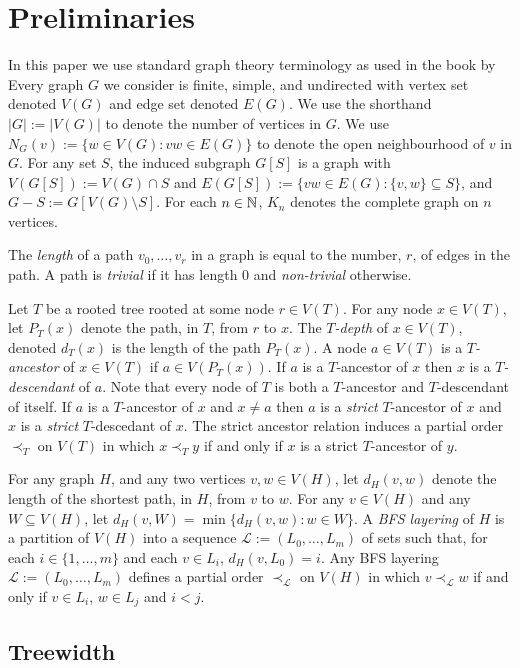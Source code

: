 \documentclass[kpfonts]{patmorin}
\theoremstyle{named}
\begin{document}
\section{Preliminaries}

In this paper we use standard graph theory terminology as used in the book by \citet{diestel:graph}
Every graph $G$ we consider is finite, simple, and undirected with vertex set denoted $V(G)$ and edge set denoted $E(G)$.  We use the shorthand $|G|:=|V(G)|$ to denote the number of vertices in $G$.  We use $N_G(v):=\{w\in V(G): vw\in E(G)\}$ to denote the open neighbourhood of $v$ in $G$.  For any set $S$, the induced subgraph  $G[S]$ is a graph with $V(G[S]):=V(G)\cap S$ and $E(G[S]):=\{vw\in E(G): \{v,w\}\subseteq S\}$, and $G-S:=G[V(G)\setminus S]$. For each $n\in\mathbb{N}$, $K_n$ denotes the complete graph on $n$ vertices.

The \emph{length} of a path $v_0,\ldots,v_r$ in a graph is equal to the number, $r$, of edges in the path. A path is \emph{trivial} if it has length 0 and \emph{non-trivial} otherwise.

Let $T$ be a rooted tree rooted at some node $r\in V(T)$.  For any node $x\in V(T)$, let $P_T(x)$ denote the path, in $T$, from $r$ to $x$.  The \emph{$T$-depth} of $x\in V(T)$, denoted $d_T(x)$ is the length of the path $P_T(x)$.  A node $a\in V(T)$ is a \emph{$T$-ancestor} of $x\in V(T)$ if $a\in V(P_T(x))$. If $a$ is a $T$-ancestor of $x$ then $x$ is a \emph{$T$-descendant} of $a$.  Note that every node of $T$ is both a $T$-ancestor and $T$-descendant of itself.  If $a$ is a $T$-ancestor of $x$ and $x\neq a$ then $a$ is a \emph{strict} $T$-ancestor of $x$ and $x$ is a \emph{strict} $T$-descedant of $x$.  The strict ancestor relation induces a partial order $\prec_T$ on $V(T)$ in which $x\prec_T y$ if and only if $x$ is a strict $T$-ancestor of $y$.

For any graph $H$, and any two vertices $v,w\in V(H)$, let $d_H(v,w)$ denote the length of the shortest path, in $H$, from $v$ to $w$. For any $v\in V(H)$ and any $W\subseteq V(H)$, let $d_H(v,W)=\min\{d_H(v,w):w\in W\}$. A \emph{BFS layering} of $H$ is a partition of $V(H)$ into a sequence $\mathcal{L}:=(L_0,\ldots,L_m)$ of sets such that, for each $i\in\{1,\ldots,m\}$ and each $v\in L_i$, $d_H(v,L_0)=i$.  Any BFS layering $\mathcal{L}:=(L_0,\ldots,L_m)$ defines a partial order $\prec_{\mathcal{L}}$ on $V(H)$ in which $v\prec_{\mathcal{L}} w$ if and only if $v\in L_i$, $w\in L_j$ and $i<j$.


\subsection{Treewidth}
\end{document}

